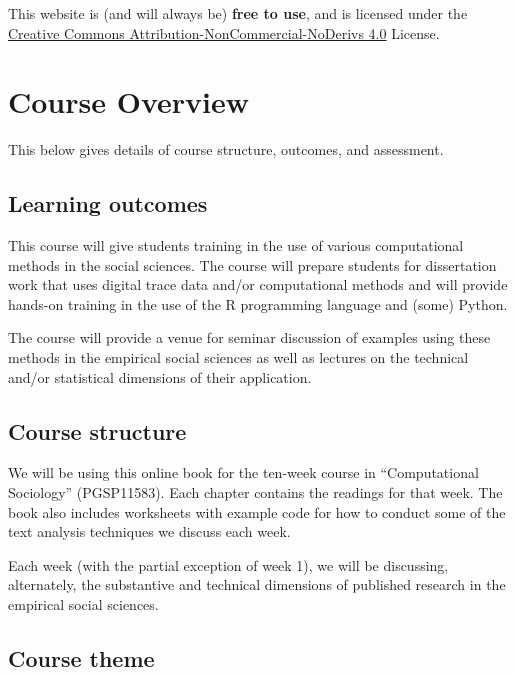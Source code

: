 \documentclass[
  letterpaper,
  DIV=11,
  numbers=noendperiod]{scrreprt}
\begin{document}
This website is (and will always be) \textbf{free to use}, and is
licensed under the
\href{https://creativecommons.org/licenses/by-nc-nd/4.0/}{Creative
Commons Attribution-NonCommercial-NoDerivs 4.0} License.


\hypertarget{course-overview}{%
\chapter*{Course Overview}\label{course-overview}}

This below gives details of course structure, outcomes, and assessment.

\hypertarget{learning-outcomes}{%
\section*{Learning outcomes}\label{learning-outcomes}}

This course will give students training in the use of various
computational methods in the social sciences. The course will prepare
students for dissertation work that uses digital trace data and/or
computational methods and will provide hands-on training in the use of
the R programming language and (some) Python.

The course will provide a venue for seminar discussion of examples using
these methods in the empirical social sciences as well as lectures on
the technical and/or statistical dimensions of their application.

\hypertarget{course-structure}{%
\section*{Course structure}\label{course-structure}}

We will be using this online book for the ten-week course in
``Computational Sociology'' (PGSP11583). Each chapter contains the
readings for that week. The book also includes worksheets with example
code for how to conduct some of the text analysis techniques we discuss
each week.

Each week (with the partial exception of week 1), we will be discussing,
alternately, the substantive and technical dimensions of published
research in the empirical social sciences.

\hypertarget{course-theme}{%
\section*{Course theme}\label{course-theme}}
\end{document}

